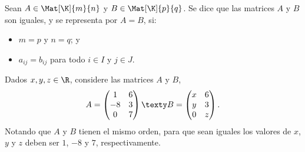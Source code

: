 \documentclass[compacto,10pt]{pubciencias-notas}
\begin{document}
\begin{defi}
    Sean $A \in \Mat[\K]{m}{n}$ y $B \in \Mat[\K]{p}{q}$. Se dice que las matrices $A$ y $B$ son iguales, y se representa por $A=B$, si:
    \begin{itemize}
    \item[$a)$] 
        $m=p$ y $n=q$; y
    \item[$b)$] 
        $a_{ij}=b_{ij}$ para todo $i\in I$ y $j \in J$.
    \end{itemize}
\end{defi}

\begin{ejem} Dados $x,y,z\in\R$, considere las matrices $A$ y $B$, 
\[
    A = \begin{pmatrix}1&6\\-8&3\\0&7\end{pmatrix}
    \texty
    B = \begin{pmatrix}x&6\\y&3\\0&z\end{pmatrix}.
\]
Notando que $A$ y $B$ tienen el mismo orden, para que sean iguales los valores de $x$, $y$ y $z$ deben ser $1$, $-8$ y $7$, respectivamente.
\end{ejem}

\end{document}
